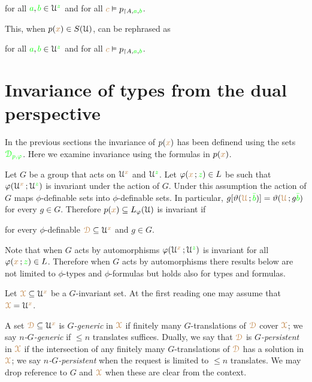 \hfill for all ${\color{green} a},{\color{green} b}\in\EuScript U^{\color{green} z}$ and for all ${\color{brown} c}\vDash p_{\restriction A,{\color{green} a},{\color{green} b}}$.

This, when $p({\color{brown} x})\in S(\EuScript U)$, can be rephrased as

\hfill for all ${\color{green} a},{\color{green} b}\in\EuScript U^{\color{green} z}$ and for all ${\color{brown} c}\vDash p_{\restriction A,{\color{green} a},{\color{green} b}}$.

\section{Invariance of types from the dual perspective}


In the previous sections the invariance of $p({\color{brown} x})$ has been definend using the sets ${\color{green}\EuScript D_{p,\varphi}}$.
Here we examine invariance using the formulas in $p({\color{brown} x})$.

Let $G$ be a group that acts on $\EuScript U^{\color{brown} x}$ and $\EuScript U^{\color{green} z}$.
Let $\varphi({\color{brown} x}\,;{\color{green} z})\in L$ be such that $\varphi(\EuScript U^{\color{brown} x}\,;\EuScript U^{\color{green} z})$ is invariant under the action of $G$.
Under this assumption the action of $G$ maps $\phi$-definable sets into $\phi$-definable sets.
In particular, $g[\vartheta({\color{brown}\EuScript U}\,;{\color{green}\bar b})]=\vartheta({\color{brown}\EuScript U}\,;g{\color{green}\bar b})$ for every $g\in G$.
Therefore $p({\color{brown} x})\subseteq L_\varphi(\EuScript U)$ is invariant if

\hfill for every $\phi$-definable ${\color{brown}\EuScript D}\subseteq\EuScript U^{\color{brown} x}$ and $g\in G$.

Note that when $G$ acts by automorphisms $\varphi(\EuScript U^{\color{brown} x}\,;\EuScript U^{\color{green} z})$ is invariant for all $\varphi({\color{brown} x}\,;{\color{green} z})\in L$.
Therefore when $G$ acts by automorphisms there results below are not limited to $\phi$-types and $\phi$-formulas but holds also for types and formulas.

Let ${\color{brown}\EuScript X}\subseteq\EuScript U^{\color{brown} x}$ be a $G$-invariant set.
At the first reading one may assume that ${\color{brown}\EuScript X}=\EuScript U^{\color{brown} x}$.%

A set ${\color{brown}\EuScript D}\subseteq\EuScript U^{\color{brown} x}$ is \emph{$G$-generic\/} in ${\color{brown}\EuScript X}$ if finitely many $G$-translations of ${\color{brown}\EuScript D}$ cover ${\color{brown}\EuScript X}$; we say \emph{$n$-$G$-generic\/} if $\le n$ translates suffices.
Dually, we say that ${\color{brown}\EuScript D}$ is \emph{$G$-persistent\/} in ${\color{brown}\EuScript X}$ if the intersection of any finitely many $G$-translations of ${\color{brown}\EuScript D}$ has a solution in ${\color{brown}\EuScript X}$; we say \emph{$n$-$G$-persistent\/} when the request is limited to $\le n$ translates.
We may drop reference to $G$ and ${\color{brown}\EuScript X}$ when these are clear from the context.

